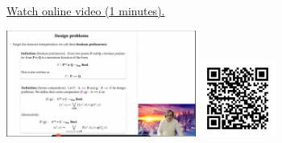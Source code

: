 
\begin{minipage}{10cm}
    \href{https://act4e-spring21.netlify.app/videos/spring2021-profunctors:gen-bool.html}{Watch online video (1 minutes).}
        
    \href{https://act4e-spring21.netlify.app/videos/spring2021-profunctors:gen-bool.html}{\includegraphics[height=3.5cm]{spring2021-profunctors:gen-bool/thumbnails.jpg}}
    \href{https://act4e-spring21.netlify.app/videos/spring2021-profunctors:gen-bool.html}{\includegraphics[height=2.5cm]{spring2021-profunctors:gen-bool/qrcode.png}}
\end{minipage}
